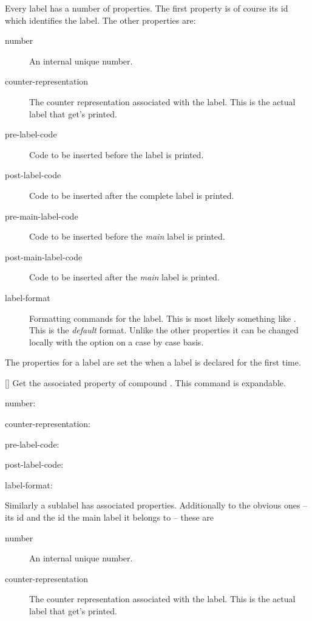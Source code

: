 \documentclass[load-preamble+,babel-options={ngerman,british,american}]{cnltx-doc}
\begin{document}
Every label has a number of properties.  The first property is of course its
\ac{id} which identifies the label.  The other properties are:
\begin{description}
  \item[number] An internal unique number.
  \item[counter-representation] The counter representation associated with the
    label.  This is the actual label that get's printed.
  \item[pre-label-code] Code to be inserted before the label is printed.
  \item[post-label-code] Code to be inserted after the complete label is
    printed.
  \item[pre-main-label-code] Code to be inserted before the \emph{main} label
    is printed.
  \item[post-main-label-code] Code to be inserted after the \emph{main} label
    is printed.
  \item[label-format] Formatting commands for the label.  This is most likely
    something like .  This is the \emph{default} format.  Unlike
    the other properties it can be changed locally with the 
    option on a case by case basis.
\end{description}

The properties for a label are set the when a label is declared for the first
time.

\begin{commands}
  \expandable{}[]
    Get the associated property  of compound .  This
    command is expandable.
\end{commands}

\begin{example}
  \def\expandfull{\romannumeral-`0}%
  \def\expandtwice{\detokenize\expandafter\expandafter\expandafter}%
  \ttfamily
  number: \par
  counter-representation: \par
  pre-label-code: \par %
  post-label-code: \par %
  label-format: \expandtwice{\expandfull\cmpdproperty{benzene}{label-format}}
\end{example}

Similarly a sublabel has associated properties.  Additionally to the obvious
ones -- its \ac{id} and the \ac{id} the main label it belongs to -- these
are
\begin{description}
  \item[number] An internal unique number.
  \item[counter-representation] The counter representation associated with the
    label.  This is the actual label that get's printed.
\end{description}
\end{document}
